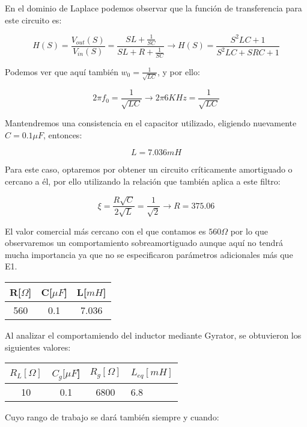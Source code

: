 En el dominio de Laplace podemos observar que la función de transferencia para este circuito es:

$$H(S)=\frac{V_{out}(S)}{V_{in}(S)}=\frac{SL+\frac{1}{SC}}{SL+R+\frac{1}{SC}} \longrightarrow H(S)=\frac{S^{2}LC+1}{S^2LC+SRC+1}$$

Podemos ver que aquí también $w_0=\frac{1}{\sqrt{LC}}$, y por ello:

$$2 \pi f_0 = \frac{1}{\sqrt{LC}} \longrightarrow 2 \pi 6KHz = \frac{1}{\sqrt{LC}}$$

Mantendremos una consistencia en el capacitor utilizado, eligiendo nuevamente $C=0.1 \mu F$, entonces:

$$L = 7.036 mH$$

Para este caso, optaremos por obtener un circuito críticamente amortiguado o cercano a él, por ello utilizando la relación que también aplica a este
filtro:

$$\xi=\frac{R \sqrt{C}}{2\sqrt{L}}=\frac{1}{\sqrt{2}} \longrightarrow R=375.06$$

El valor comercial más cercano con el que contamos es $560 \Omega$ por lo que observaremos un comportamiento sobreamortiguado aunque aquí
no tendrá mucha importancia ya que no se especificaron parámetros adicionales más que E1.

\begin{table}[H]
    \centering
    \begin{tabular}{|c|c|c|}
    \hline
    \rowcolor[HTML]{C0C0C0} 
    R[$\Omega$] & C[$\mu F$] & L[$mH$]  \\ \hline
    560     & 0.1  & 7.036 \\ \hline
    \end{tabular}
    \end{table}

Al analizar el comportamiendo del inductor mediante Gyrator, se obtuvieron los siguientes valores:

\begin{table}[H]
    \centering
    \begin{tabular}{|c|c|c|l|}
    \hline
    \rowcolor[HTML]{C0C0C0} 
    $R_L[\Omega]$ & $C_g[\mu F$] & $R_g[\Omega]$  & $L_{eq}[mH]$ \\ \hline
    10      & 0.1  & 6800 & 6.8        \\ \hline
    \end{tabular}
    \end{table}

Cuyo rango de trabajo se dará también siempre y cuando:

